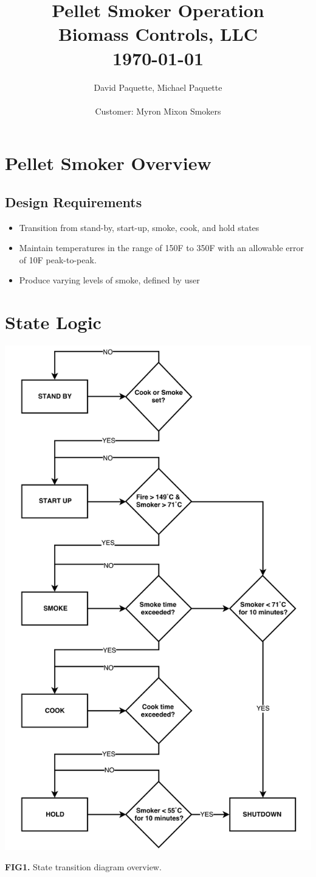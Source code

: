 \documentclass{article}
\title{\textbf{Pellet Smoker Operation}\\ Biomass Controls, LLC  \\ \today}
\author{David Paquette, Michael Paquette \\\\Customer: Myron Mixon Smokers}
\date{}
\begin{document}
\maketitle
\tableofcontents
\section{Pellet Smoker Overview}
\subsection{Design Requirements}
\begin{itemize}  
\item Transition from stand-by, start-up, smoke, cook, and hold states 
\item Maintain temperatures in the range of 150\degree F  to 350\degree F with an allowable error of 10\degree F peak-to-peak.
\item Produce varying levels of smoke, defined by user
\end{itemize}
\section{State Logic}
\begin{center}
\includegraphics[scale=.5]{stateTransition}
\centering
\end{center}
\textbf{FIG1.} State transition diagram overview.
\end{document}
